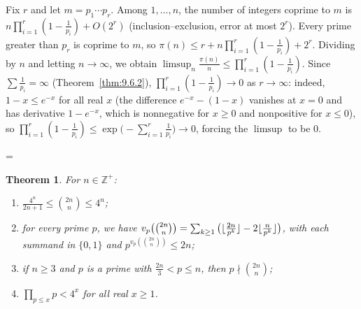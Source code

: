 \documentclass[11pt]{article}
\makeatletter
\theoremstyle{ntstyle}
\newtheorem{theorem}{Theorem}[subsection]
\let\nt@closedisplay\]
\def\nt@guardedclose{\@ifnextchar\par{\nt@closeafterpar}{\@ifnextchar\end{\postdisplaypenalty\@M\nt@closedisplay}{\nt@closedisplay}}}
\def\nt@closeafterpar\par{\@ifnextchar\par{\nt@closeafterpar}{\@ifnextchar\end{\postdisplaypenalty\@M\nt@closedisplay\par}{\nt@closedisplay\par}}}
\renewenvironment{proof}[1][\proofname]{\par
  \pushQED{\qed}\normalfont\topsep\medskipamount\edef\nt@afterproof{\@endparpenalty=\the\@endparpenalty\relax}\@beginparpenalty\@M\@endparpenalty\@M\let\]\nt@guardedclose\trivlist\item[]\textit{#1\@addpunct{.}} \ignorespaces}{\ifvmode\addpenalty\@M\fi\popQED\nt@afterproof\endtrivlist\@endpefalse}
\makeatother
\begin{document}
\begin{proof} Fix $r$ and let $m = p_1\cdots p_r$. Among
	$1,\ldots,n$, the number of integers coprime to $m$ is
	$n\prod_{i=1}^r(1-\tfrac{1}{p_i}) + O(2^r)$ (inclusion--exclusion,
	error at most $2^r$). Every prime greater than $p_r$ is coprime to $m$, so
	$\pi(n) \le r + n\prod_{i=1}^r(1-\tfrac{1}{p_i}) + 2^r$. Dividing by
	$n$ and letting $n\to\infty$, we obtain $\limsup_n \tfrac{\pi(n)}{n} \le
		\prod_{i=1}^r(1-\tfrac{1}{p_i})$. Since $\sum\tfrac{1}{p_i}=\infty$
	(Theorem~\ref{thm:9.6.2}), $\prod_{i=1}^r(1-\tfrac{1}{p_i})\to 0$ as
	$r\to\infty$: indeed, $1-x\le e^{-x}$ for all real $x$ (the difference
	$e^{-x}-(1-x)$ vanishes at $x=0$ and has derivative $1-e^{-x}$, which is
	nonnegative for $x\ge0$ and nonpositive for $x\le0$), so
	$\prod_{i=1}^{r}(1-\tfrac{1}{p_i})\le\exp\big(-\sum_{i=1}^{r}\tfrac{1}{p_i}\big)\to0$,
	forcing the $\limsup$ to be $0$.

\end{proof}
\begin{theorem}\label{thm:9.6.4} For $n\in\mathbb{Z}^+$:
	\begin{enumerate}[label={\alph*)}]
		\item $\tfrac{4^n}{2n+1}\le\binom{2n}{n}\le 4^n$;
		\item for every prime $p$,
		      we have $v_p\bigl(\tbinom{2n}{n}\bigr)=\sum_{k\ge1}\big(\lfloor\tfrac{2n}{p^k}\rfloor-2\lfloor\tfrac{n}{p^k}\rfloor\big)$,
		      with each summand in $\{0,1\}$ and
		      $p^{v_p\left(\binom{2n}{n}\right)}\le 2n$;
		\item if $n\ge3$ and $p$ is a prime with $\tfrac{2n}{3}<p\le n$, then
		      $p\nmid\binom{2n}{n}$;
		\item $\prod_{p\le x}p<4^{x}$ for all real $x\ge1$.
	\end{enumerate}

\end{theorem}
\end{document}
